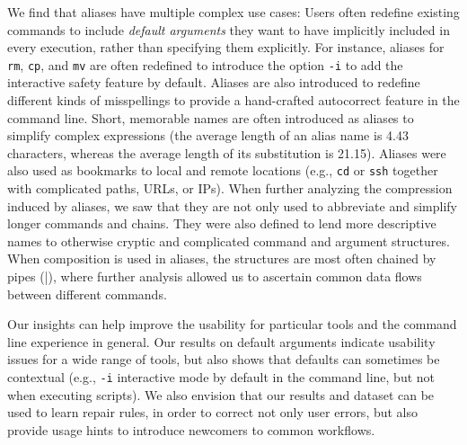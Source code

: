 We find that aliases have multiple complex use cases:
Users often redefine existing commands to include \emph{default arguments} they want to have implicitly included in every execution, rather than specifying them explicitly.
For instance, aliases for \verb|rm|, \verb|cp|, and \verb|mv| are often redefined to introduce the option \verb|-i| to add the interactive safety feature by default.
Aliases are also introduced to redefine different kinds of misspellings to provide a hand-crafted autocorrect feature in the command line. 
Short, memorable names are often introduced as aliases to simplify complex expressions (the average length of an alias name is 4.43 characters, whereas the average length of its substitution is 21.15).
Aliases were also used as bookmarks to local and remote locations (e.g., \verb|cd| or \verb|ssh| together with complicated paths, URLs, or IPs).
When further analyzing the compression induced by aliases, we saw that they are not only used to abbreviate and simplify longer commands and chains.
They were also defined to lend more descriptive names to otherwise cryptic and complicated command and argument structures.
When composition is used in aliases, the structures are most often chained by pipes (\verb|||), where further analysis allowed us to ascertain common data flows between different commands.

Our insights can help improve the usability for particular tools and the command line experience in general.
Our results on default arguments indicate usability issues for a wide range of tools, but also shows that defaults can sometimes be contextual (e.g., \verb|-i| interactive mode by default in the command line, but not when executing scripts).
We also envision that our results and dataset can be used to learn repair rules, in order to correct not only user errors, but also provide usage hints to introduce newcomers to common workflows.